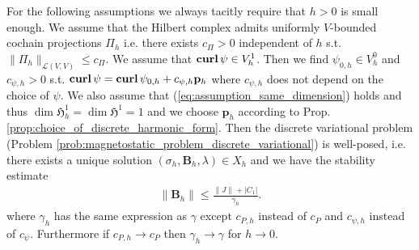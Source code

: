 \documentclass[../master_thesis.tex]{subfiles}
\begin{document}
\begin{theorem}
    For the following assumptions we always tacitly require that 
    $h>0$ is small enough. We assume that the Hilbert complex admits uniformly $V$-bounded 
    cochain projections $\Pi_h$ i.e. 
    there exists $c_\Pi > 0$ independent of $h$ s.t. $\lVert \Pi_h \rVert _{\mathcal{L}(V,V)} \leq c_\Pi$.
    We assume that $\veccurl \psi \in V_h^1$. Then we find 
    $\psi_{0,h} \in V_h^0$ and $c_{\psi,h}>0$ 
    s.t. $\veccurl \psi  = \veccurl \psi_{0,h} + c_{\psi,h}\mathbf{p}_h$
    where $c_{\psi,h}$ does not depend on the choice of $\psi$.
    We also assume that (\ref{eq:assumption_same_dimension}) holds and thus 
    $\dim \mathfrak{H}^1_h = \dim \mathfrak{H}^1 = 1$ and we choose 
    $\mathbf{p}_h$ according to Prop.\,\ref{prop:choice_of_discrete_harmonic_form}.
    Then the discrete variational problem (Problem \ref{prob:magnetostatic_problem_discrete_variational})
    is well-posed, i.e. there exists a 
    unique solution $(\sigma_h, \mathbf{B}_h,\lambda) \in X_h$ and
    we have the stability estimate 
    \begin{align*}
        \lVert \mathbf{B}_h \rVert  
        \leq \frac{\lVert J \rVert + |C_1|}{\gamma_h}.
    \end{align*}
    where $\gamma_h$ has the same expression as $\gamma$ except  
    $c_{P,h}$ instead of $c_P$ and $c_{\psi,h}$ instead of $c_{\psi}$.
    Furthermore if $c_{P,h} \rightarrow c_P$ then $\gamma_h \rightarrow \gamma$ for $h \rightarrow 0$.
\end{theorem}
\end{document}
